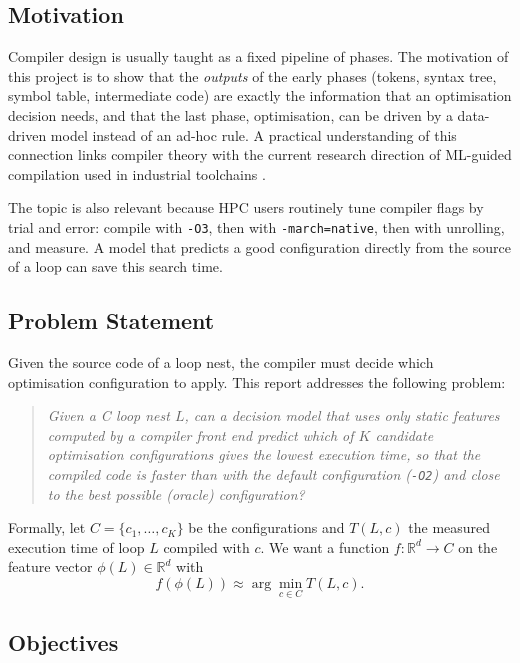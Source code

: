 \documentclass[12pt,a4paper]{article}
\begin{document}
\subsection{Motivation}

Compiler design is usually taught as a fixed pipeline of phases. The motivation
of this project is to show that the \emph{outputs} of the early phases (tokens,
syntax tree, symbol table, intermediate code) are exactly the information that
an optimisation decision needs, and that the last phase, optimisation, can be
driven by a data-driven model instead of an ad-hoc rule. A practical
understanding of this connection links compiler theory with the current
research direction of ML-guided compilation used in industrial toolchains
\cite{trofin2021,chen2018}.

The topic is also relevant because HPC users routinely tune compiler flags by
trial and error: compile with \texttt{-O3}, then with \texttt{-march=native},
then with unrolling, and measure. A model that predicts a good configuration
directly from the source of a loop can save this search time.

\subsection{Problem Statement}

Given the source code of a loop nest, the compiler must decide which
optimisation configuration to apply. This report addresses the following
problem:

\begin{quote}
\textit{Given a C loop nest $L$, can a decision model that uses only static
features computed by a compiler front end predict which of $K$ candidate
optimisation configurations gives the lowest execution time, so that the
compiled code is faster than with the default configuration (\texttt{-O2})
and close to the best possible (oracle) configuration?}
\end{quote}

Formally, let $C=\{c_1,\dots,c_K\}$ be the configurations and $T(L,c)$ the
measured execution time of loop $L$ compiled with $c$. We want a function
$f:\mathbb{R}^{d}\rightarrow C$ on the feature vector $\phi(L)\in\mathbb{R}^{d}$ with
\begin{equation}
f(\phi(L)) \approx \arg\min_{c\in C} T(L,c).
\end{equation}

\subsection{Objectives}
\end{document}
